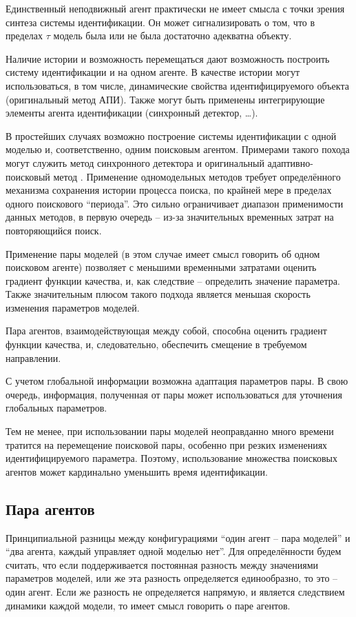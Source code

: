 Единственный неподвижный агент практически не имеет смысла
с точки зрения синтеза системы идентификации.
Он может сигнализировать о том, что в пределах
\(\tau\) модель была или не была достаточно адекватна
объекту.

Наличие истории и возможность перемещаться дают возможность
построить систему идентификации и на одном агенте.
В качестве истории могут использоваться, в том числе,
динамические свойства идентифицируемого объекта
(оригинальный метод АПИ). Также могут быть
применены интегрирующие элементы агента идентификации
(синхронный детектор, \ldots).

В простейших случаях возможно построение системы идентификации
с одной моделью и, соответственно, одним поисковым агентом.
Примерами такого похода могут служить
метод синхронного детектора \cite{adopt_cont_sys}
и оригинальный адаптивно-поисковый метод \cite{mich_92}.
Применение одномодельных методов требует определённого механизма
сохранения истории процесса поиска, по крайней мере в пределах
одного поискового ``периода''. Это сильно ограничивает диапазон
применимости данных методов, в первую очередь -- из-за значительных
временных затрат на повторяющийся поиск.

Применение пары моделей \cite{atu_asau3}
(в этом случае имеет смысл говорить об одном поисковом агенте)
позволяет с меньшими временными затратами оценить градиент функции качества,
и, как следствие -- определить значение параметра. Также значительным плюсом
такого подхода является меньшая скорость изменения параметров моделей.


Пара агентов, взаимодействующая между собой,
способна оценить градиент функции качества,
и, следовательно, обеспечить смещение в требуемом направлении.

С учетом глобальной информации возможна адаптация параметров пары.
В свою очередь, информация, полученная от пары может
использоваться для уточнения глобальных параметров.


Тем не менее, при использовании пары моделей неоправданно много времени
тратится на перемещение поисковой пары, особенно при резких изменениях
идентифицируемого параметра. Поэтому, использование множества
поисковых агентов может кардинально уменьшить время идентификации.

\subsection{Пара агентов}

Принципиальной разницы между конфигурациями
``один агент -- пара моделей''
и
``два агента, каждый управляет одной моделью нет''.
Для определённости будем считать, что если поддерживается
постоянная разность между значениями параметров моделей,
или же эта разность определяется единообразно,
то это -- один агент. Если же разность
не определяется напрямую, и является следствием динамики каждой модели,
то имеет смысл говорить о паре агентов.

